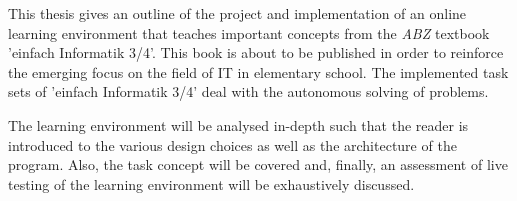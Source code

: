 This thesis gives an outline of the project and implementation of an online learning environment that teaches important concepts from the \textit{ABZ} textbook 'einfach Informatik 3/4'. This book is about to be published in order to reinforce the emerging focus on the field of IT in elementary school. The implemented task sets of 'einfach Informatik 3/4' deal with the autonomous solving of problems.

The learning environment will be analysed in-depth such that the reader is introduced to the various design choices as well as the architecture of the program. Also, the task concept will be covered and, finally, an assessment of live testing of the learning environment will be exhaustively discussed. 



